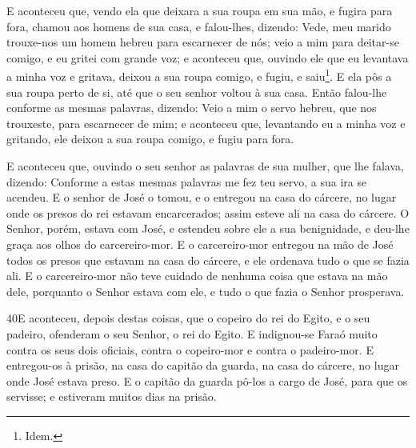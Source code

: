 E aconteceu que, vendo ela que deixara a sua roupa em sua mão, e
fugira para fora, chamou aos homens de sua casa, e
falou-lhes, dizendo: Vede, meu marido trouxe-nos um homem hebreu
para escarnecer de nós; veio a mim para deitar-se comigo, e eu
gritei com grande voz; e aconteceu que, ouvindo ele que eu
levantava a minha voz e gritava, deixou a sua roupa comigo, e fugiu,
e saiu\footnote{Idem.}. E ela pôs a sua roupa perto de si,
até que o seu senhor voltou à sua casa. Então falou-lhe
conforme as mesmas palavras, dizendo: Veio a mim o servo hebreu, que
nos trouxeste, para escarnecer de mim; e aconteceu que,
levantando eu a minha voz e gritando, ele deixou a sua roupa comigo,
e fugiu para fora.

E aconteceu que, ouvindo o seu senhor as palavras de sua mulher,
que lhe falava, dizendo: Conforme a estas mesmas palavras me fez teu
servo, a sua ira se acendeu. E o senhor de José o tomou, e o
entregou na casa do cárcere, no lugar onde os presos do rei estavam
encarcerados; assim esteve ali na casa do cárcere. O Senhor,
porém, estava com José, e estendeu sobre ele a sua benignidade, e
deu-lhe graça aos olhos do carcereiro-mor. E o carcereiro-mor
entregou na mão de José todos os presos que estavam na casa do
cárcere, e ele ordenava tudo o que se fazia ali. E o
carcereiro-mor não teve cuidado de nenhuma coisa que estava na mão
dele, porquanto o Senhor estava com ele, e tudo o que fazia o Senhor
prosperava.

\smallskip

\lettrine{40} E aconteceu, depois destas coisas, que o copeiro
do rei do Egito, e o seu padeiro, ofenderam o seu Senhor, o rei do
Egito. E indignou-se Faraó muito contra os seus dois oficiais,
contra o copeiro-mor e contra o padeiro-mor. E entregou-os à
prisão, na casa do capitão da guarda, na casa do cárcere, no lugar
onde José estava preso. E o capitão da guarda pô-los a cargo de
José, para que os servisse; e estiveram muitos dias na prisão.

